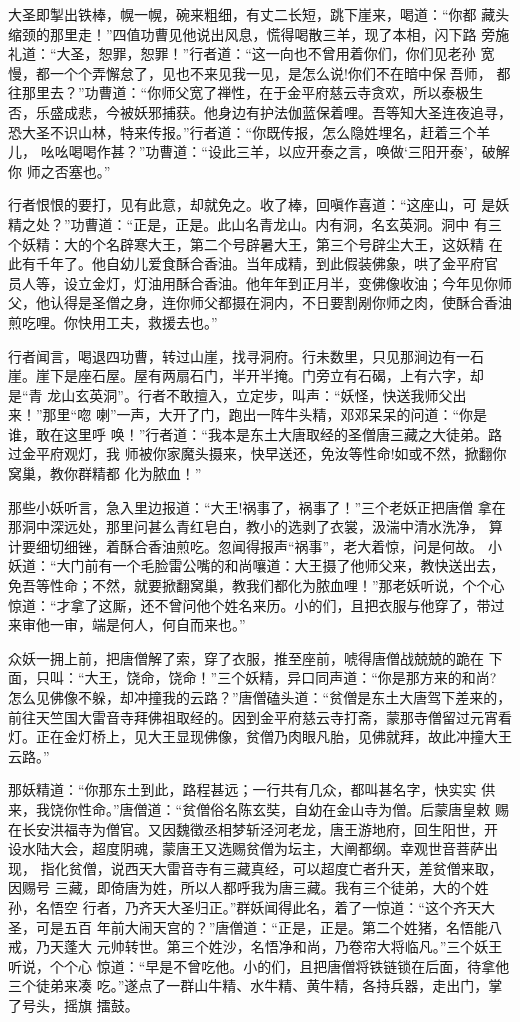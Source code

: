 大圣即掣出铁棒，幌一幌，碗来粗细，有丈二长短，跳下崖来，喝道：“你都
藏头缩颈的那里走！”四值功曹见他说出风息，慌得喝散三羊，现了本相，闪下路
旁施礼道：“大圣，恕罪，恕罪！”行者道：“这一向也不曾用着你们，你们见老孙
宽慢，都一个个弄懈怠了，见也不来见我一见，是怎么说!你们不在暗中保吾师，
都往那里去？”功曹道：“你师父宽了禅性，在于金平府慈云寺贪欢，所以泰极生
否，乐盛成悲，今被妖邪捕获。他身边有护法伽蓝保着哩。吾等知大圣连夜追寻，
恐大圣不识山林，特来传报。”行者道：“你既传报，怎么隐姓埋名，赶着三个羊儿，
吆吆喝喝作甚？”功曹道：“设此三羊，以应开泰之言，唤做‘三阳开泰’，破解你
师之否塞也。”

行者恨恨的要打，见有此意，却就免之。收了棒，回嗔作喜道：“这座山，可
是妖精之处？”功曹道：“正是，正是。此山名青龙山。内有洞，名玄英洞。洞中
有三个妖精：大的个名辟寒大王，第二个号辟暑大王，第三个号辟尘大王，这妖精
在此有千年了。他自幼儿爱食酥合香油。当年成精，到此假装佛象，哄了金平府官
员人等，设立金灯，灯油用酥合香油。他年年到正月半，变佛像收油；今年见你师
父，他认得是圣僧之身，连你师父都摄在洞内，不日要割剐你师之肉，使酥合香油
煎吃哩。你快用工夫，救援去也。”

行者闻言，喝退四功曹，转过山崖，找寻洞府。行未数里，只见那涧边有一石
崖。崖下是座石屋。屋有两扇石门，半开半掩。门旁立有石碣，上有六字，却是“青
龙山玄英洞”。行者不敢擅入，立定步，叫声：“妖怪，快送我师父出来！”那里“唿
喇”一声，大开了门，跑出一阵牛头精，邓邓呆呆的问道：“你是谁，敢在这里呼
唤！”行者道：“我本是东土大唐取经的圣僧唐三藏之大徒弟。路过金平府观灯，我
师被你家魔头摄来，快早送还，免汝等性命!如或不然，掀翻你窝巢，教你群精都
化为脓血！”

那些小妖听言，急入里边报道：“大王!祸事了，祸事了！”三个老妖正把唐僧
拿在那洞中深远处，那里问甚么青红皂白，教小的选剥了衣裳，汲湍中清水洗净，
算计要细切细锉，着酥合香油煎吃。忽闻得报声“祸事”，老大着惊，问是何故。
小妖道：“大门前有一个毛脸雷公嘴的和尚嚷道：大王摄了他师父来，教快送出去，
免吾等性命；不然，就要掀翻窝巢，教我们都化为脓血哩！”那老妖听说，个个心
惊道：“才拿了这厮，还不曾问他个姓名来历。小的们，且把衣服与他穿了，带过
来审他一审，端是何人，何自而来也。”

众妖一拥上前，把唐僧解了索，穿了衣服，推至座前，唬得唐僧战兢兢的跪在
下面，只叫：“大王，饶命，饶命！”三个妖精，异口同声道：“你是那方来的和尚?
怎么见佛像不躲，却冲撞我的云路？”唐僧磕头道：“贫僧是东土大唐驾下差来的，
前往天竺国大雷音寺拜佛祖取经的。因到金平府慈云寺打斋，蒙那寺僧留过元宵看
灯。正在金灯桥上，见大王显现佛像，贫僧乃肉眼凡胎，见佛就拜，故此冲撞大王
云路。”

那妖精道：“你那东土到此，路程甚远；一行共有几众，都叫甚名字，快实实
供来，我饶你性命。”唐僧道：“贫僧俗名陈玄奘，自幼在金山寺为僧。后蒙唐皇敕
赐在长安洪福寺为僧官。又因魏徵丞相梦斩泾河老龙，唐王游地府，回生阳世，开
设水陆大会，超度阴魂，蒙唐王又选赐贫僧为坛主，大阐都纲。幸观世音菩萨出现，
指化贫僧，说西天大雷音寺有三藏真经，可以超度亡者升天，差贫僧来取，因赐号
三藏，即倚唐为姓，所以人都呼我为唐三藏。我有三个徒弟，大的个姓孙，名悟空
行者，乃齐天大圣归正。”群妖闻得此名，着了一惊道：“这个齐天大圣，可是五百
年前大闹天宫的？”唐僧道：“正是，正是。第二个姓猪，名悟能八戒，乃天蓬大
元帅转世。第三个姓沙，名悟净和尚，乃卷帘大将临凡。”三个妖王听说，个个心
惊道：“早是不曾吃他。小的们，且把唐僧将铁链锁在后面，待拿他三个徒弟来凑
吃。”遂点了一群山牛精、水牛精、黄牛精，各持兵器，走出门，掌了号头，摇旗
擂鼓。

